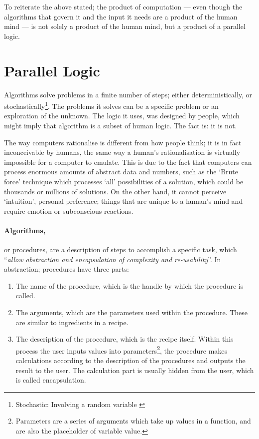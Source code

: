 To reiterate the above stated; the product of computation --- even though the algorithms that govern
it and the input it needs are a product of the human mind --- is not solely a product of the human
mind, but a product of a parallel logic.

\section{Parallel Logic}

Algorithms solve problems in a finite number of steps; either deterministically, or
stochastically\footnote{Stochastic: Involving a random variable \cite{merriam03}}. The problems it
solves can be a specific problem or an exploration of the unknown. The logic it uses, was designed
by people, which might imply that algorithm is a subset of human logic. The fact is: it is not.

The way computers rationalise is different from how people think; it is in fact inconceivable by
humans, the same way a human's rationalisation is virtually impossible for a computer to emulate.
This is due to the fact that computers can process enormous amounts of abstract data and numbers,
such as the `Brute force' technique which processes `all' possibilities of a solution, which could be
thousands or millions of solutions. On the other hand, it cannot perceive `intuition', personal
preference; things that are unique to a human's mind and require emotion or subconscious
reactions.

\paragraph{Algorithms,}or procedures, are a description of steps to accomplish a specific task,
which ``\emph{allow abstraction and encapsulation of complexity and
re-usability}''\cite{hernandez06}. In abstraction; procedures have three parts:
\begin{enumerate}
  \item The name of the procedure, which is the handle by which the procedure is called.
  \item The arguments, which are the parameters used within the procedure. These are similar to
  ingredients in a recipe.
  \item The description of the procedure, which is the recipe itself. Within this process the user
  inputs values into parameters\footnote{Parameters are a series of arguments which take up values
  in a function, and are also the placeholder of variable value.}, the procedure makes calculations
  according to the description of the procedures and outputs the result to the user. The calculation
  part is usually hidden from the user, which is called encapsulation.
\end{enumerate}

